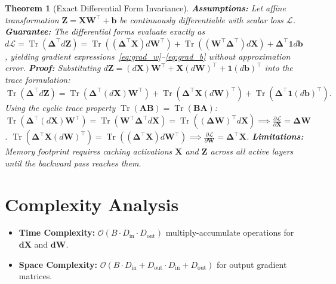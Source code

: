 \documentclass[11pt]{article}
\newtheorem{theorem}{Theorem}
\begin{document}
\begin{theorem}[Exact Differential Form Invariance]
\label{thm:matrix_chain_rule}
\textbf{Assumptions:} Let affine transformation $\mathbf{Z} = \mathbf{X} \mathbf{W}^\top + \mathbf{b}$ be continuously differentiable with scalar loss $\mathcal{L}$.
\textbf{Guarantee:} The differential forms evaluate exactly as $d\mathcal{L} = \operatorname{Tr}(\mathbf{\Delta}^\top d\mathbf{Z}) = \operatorname{Tr}((\mathbf{\Delta}^\top \mathbf{X}) d\mathbf{W}^\top) + \operatorname{Tr}((\mathbf{W}^\top \mathbf{\Delta}^\top) d\mathbf{X}) + \mathbf{\Delta}^\top \mathbf{1} d\mathbf{b}$, yielding gradient expressions~\eqref{eq:grad_w}--\eqref{eq:grad_b} without approximation error.
\textbf{Proof:}
Substituting $d\mathbf{Z} = (d\mathbf{X})\mathbf{W}^\top + \mathbf{X}(d\mathbf{W})^\top + \mathbf{1}(d\mathbf{b})^\top$ into the trace formulation:
\begin{equation}
\operatorname{Tr}(\mathbf{\Delta}^\top d\mathbf{Z}) = \operatorname{Tr}(\mathbf{\Delta}^\top (d\mathbf{X})\mathbf{W}^\top) + \operatorname{Tr}(\mathbf{\Delta}^\top \mathbf{X} (d\mathbf{W})^\top) + \operatorname{Tr}(\mathbf{\Delta}^\top \mathbf{1} (d\mathbf{b})^\top).
\end{equation}
Using the cyclic trace property $\operatorname{Tr}(\mathbf{A}\mathbf{B}) = \operatorname{Tr}(\mathbf{B}\mathbf{A})$:
$\operatorname{Tr}(\mathbf{\Delta}^\top (d\mathbf{X})\mathbf{W}^\top) = \operatorname{Tr}(\mathbf{W}^\top \mathbf{\Delta}^\top d\mathbf{X}) = \operatorname{Tr}((\mathbf{\Delta}\mathbf{W})^\top d\mathbf{X}) \implies \frac{\partial \mathcal{L}}{\partial \mathbf{X}} = \mathbf{\Delta}\mathbf{W}$.
$\operatorname{Tr}(\mathbf{\Delta}^\top \mathbf{X} (d\mathbf{W})^\top) = \operatorname{Tr}(( \mathbf{\Delta}^\top \mathbf{X} ) d\mathbf{W}^\top) \implies \frac{\partial \mathcal{L}}{\partial \mathbf{W}} = \mathbf{\Delta}^\top \mathbf{X}$.
\textbf{Limitations:} Memory footprint requires caching activations $\mathbf{X}$ and $\mathbf{Z}$ across all active layers until the backward pass reaches them.
\end{theorem}

\section{Complexity Analysis}
\label{sec:complexity}

\begin{itemize}
    \item \textbf{Time Complexity:} $\mathcal{O}(B \cdot D_{\mathrm{in}} \cdot D_{\mathrm{out}})$ multiply-accumulate operations for $\mathbf{dX}$ and $\mathbf{dW}$.
    \item \textbf{Space Complexity:} $\mathcal{O}(B \cdot D_{\mathrm{in}} + D_{\mathrm{out}} \cdot D_{\mathrm{in}} + D_{\mathrm{out}})$ for output gradient matrices.
\end{itemize}
\end{document}
